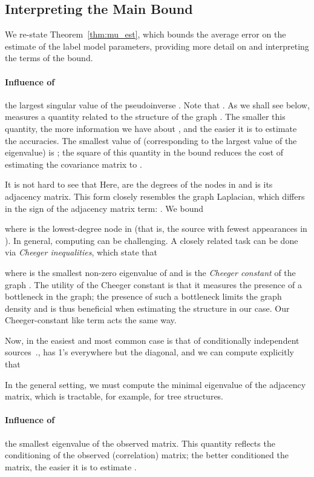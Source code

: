 \documentclass[letterpaper]{article}
\begin{document}
\begin{appendix}
\subsection{Interpreting the Main Bound} 
\label{appendix:interpreting-bound}
We re-state Theorem~\ref{thm:mu_est}, which bounds the average error on the estimate of the label model parameters, providing more detail on and interpreting the terms of the bound.

\thmmuest*

\paragraph*{Influence of } the largest singular value of the pseudoinverse . Note that . As we shall see below,  measures a quantity related to the structure of the graph . The smaller this quantity, the more information we have about , and the easier it is to estimate the accuracies. The smallest value of  (corresponding to the largest value of the eigenvalue) is ; the square of this quantity in the bound reduces the  cost of estimating the covariance matrix to .

It is not hard to see that  Here,  are the degrees of the nodes in  and  is its adjacency matrix. This form closely resembles the graph Laplacian, which differs in the sign of the adjacency matrix term: . We bound

where  is the lowest-degree node in  (that is, the source  with fewest appearances in ). In general, computing  can be challenging. A closely related task can be done via \emph{Cheeger inequalities}, which state that 

where  is the smallest non-zero eigenvalue of  and  is the \emph{Cheeger constant} of the graph \cite{cheeger}. The utility of the Cheeger constant is that it measures the presence of a bottleneck in the graph; the presence of such a bottleneck limits the graph density and is thus beneficial when estimating the structure in our case. Our Cheeger-constant like term  acts the same way.

Now, in the easiest and most common case is that of conditionally independent sources~\cite{dalvi:www13,zhang2014spectral,dalvi:www13,karger2011iterative}.,  has 1's everywhere but the diagonal, and we can compute explicitly that 
 
In the general setting, we must compute the minimal eigenvalue of the adjacency matrix, which is tractable, for example, for tree structures.  

\paragraph*{Influence of } the smallest eigenvalue of the observed matrix. This quantity reflects the conditioning of the observed (correlation) matrix; the better conditioned the matrix, the easier it is to estimate .


\end{appendix}
\end{document}
